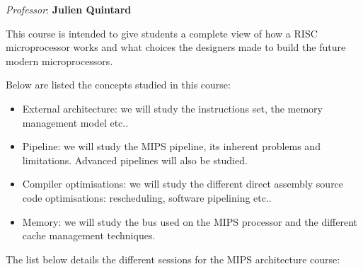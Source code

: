 \begin{multicols}{2}
\textit{Professor}: \textbf{Julien Quintard}

This course is intended to give students a complete view of how a RISC
microprocessor works and what choices the designers made to build the
future modern microprocessors.

Below are listed the concepts studied in this course:

\begin{itemize}
  \item
    External architecture: we will study the instructions set,
    the memory management model etc..
  \item
    Pipeline: we will study the MIPS pipeline, its inherent problems
    and limitations. Advanced pipelines will also be studied.
  \item
    Compiler optimisations: we will study the different direct assembly
    source code optimisations: rescheduling, software pipelining etc..
  \item
    Memory: we will study the bus used on the MIPS processor and
    the different cache management techniques.
\end{itemize}

The list below details the different sessions for the MIPS architecture
course:


\end{multicols}
